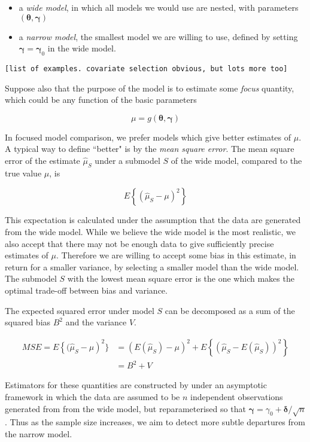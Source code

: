 \documentclass[article,shortnames,nojss,nofooter]{jss}\usepackage[]{graphicx}\usepackage[]{color}
\newcommand{\btheta}{\boldsymbol{\theta}}
\newcommand{\bgamma}{\boldsymbol{\gamma}}
\newcommand{\bdelta}{\boldsymbol{\delta}}
\begin{document}
\begin{itemize}
\item a \emph{wide model}, in which all models we would use are nested, with parameters $(\btheta,\bgamma)$

\item a \emph{narrow model}, the smallest model we are willing to use, defined by setting $\bgamma=\bgamma_0$ in the wide model. 
\end{itemize}

\texttt{[list of examples.  covariate selection obvious, but lots more too]}

Suppose also that the purpose of the model is to estimate some \emph{focus} quantity, which could be any function of the basic parameters 

$$\mu = g(\btheta, \bgamma)$$

In focused model comparison, we prefer models which give better estimates of $\mu$.  A typical way to define ``better" is by the \emph{mean square error}.  The mean square error of the estimate $\hat\mu_S$ under a submodel $S$ of the wide model, compared to the true value $\mu$, is 

$$E\left\{(\hat\mu_S - \mu)^2\right\}$$ 

This expectation is calculated under the assumption that the data are generated from the wide model.   While we believe the wide model is the most realistic, we also accept that there may not be enough data to give sufficiently precise estimates of $\mu$.  Therefore we are willing to accept some bias in this estimate, in return for a smaller variance, by selecting a smaller model than the wide model.  The submodel $S$ with the lowest mean square error is the one which makes the optimal trade-off between bias and variance. 

The expected squared error under model $S$ can be decomposed as a sum of the squared bias $B^2$ and the variance $V$. 

\begin{equation}
  \label{eq:mse}
\begin{aligned}
MSE = E\left\{(\hat\mu_S - \mu\right)^2\}  & = (E(\hat\mu_S)- \mu)^2 + E\left\{(\hat\mu_S -  E(\hat\mu_S))^2\right\} \\
    & = B^2 + V
\end{aligned}
\end{equation}

Estimators for these quantities are constructed by \citet{fic} under
an asymptotic framework in which the data are assumed to be $n$
independent observations generated from 
from the wide model, but reparameterised so that $\bgamma = \gamma_0 +
\bdelta / \sqrt{n}$.  Thus as the sample size increases, we aim to
detect more subtle departures from the narrow model. 
\end{document}
